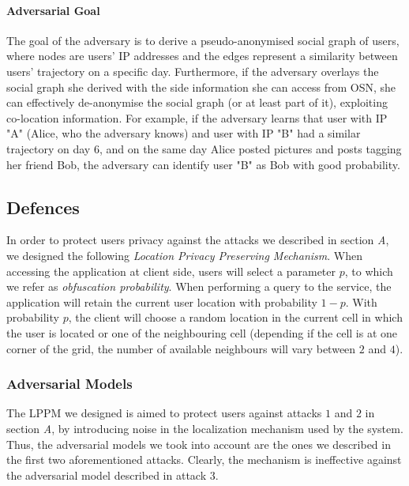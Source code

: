\documentclass[10pt,conference,compsocconf]{IEEEtran}
\begin{document}
\paragraph{Adversarial Goal}
The goal of the adversary is to derive a pseudo-anonymised social graph of users, where nodes are users' IP addresses and the edges represent a similarity between users' trajectory on a specific day. Furthermore, if the adversary overlays the social graph she derived with the side information she can access from OSN, she can effectively de-anonymise the social graph (or at least part of it), exploiting co-location information. For example, if the adversary learns that user with IP "A" (Alice, who the adversary knows) and user with IP "B" had a similar trajectory on day 6, and on the same day Alice posted pictures and posts tagging her friend Bob, the adversary can identify user "B" as Bob with good probability.

\subsection{Defences}
In order to protect users privacy against the attacks we described in section
\textit{A}, we designed the following \textit{Location Privacy Preserving
Mechanism}. When accessing the application at client side, users will select a
parameter $p$, to which we refer as \textit{obfuscation probability}. When
performing a query to the service, the application will retain the current user
location with probability $1-p$. With probability $p$, the client will choose a
random location in the current cell in which the user is located or one of the
neighbouring cell (depending if the cell is at one corner of the grid, the
number of available neighbours will vary between $2$ and $4$).
\subsubsection{Adversarial Models}
The LPPM we designed is aimed to protect users against attacks $1$ and $2$ in
section \textit{A}, by introducing noise in the localization mechanism used by
the system. Thus, the adversarial models we took into account are the ones we
described in the first two aforementioned attacks. Clearly, the mechanism is ineffective
against the adversarial model described in attack $3$.
\end{document}
